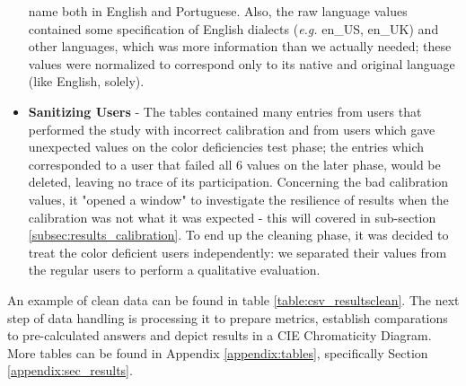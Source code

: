 \begin{itemize}
  name both in English and Portuguese. Also, the raw language values contained some specification of English dialects (\emph{e.g.} en\_US, en\_UK) and other languages,
  which was more information than we actually needed; these values were normalized to correspond only to its native and original language (like English, solely).
  \item \textbf{Sanitizing Users} - The tables contained many entries from users that performed the study with incorrect calibration and from users which
  gave unexpected values on the color deficiencies test phase; the entries which corresponded to a user that failed all 6 values on the later phase, would be
  deleted, leaving no trace of its participation. Concerning the bad calibration values, it "opened a window" to investigate the resilience of results when the
  calibration was not what it was expected - this will covered in sub-section \ref{subsec:results_calibration}. To end up the cleaning phase,
  it was decided to treat the color deficient users independently: we separated their values from the regular users to perform a qualitative evaluation.
\end{itemize} \par
%
An example of clean data can be found in table \ref{table:csv_resultsclean}. The next step of data handling is processing it to prepare metrics, establish comparations
to pre-calculated answers and depict results in a CIE Chromaticity Diagram. More tables can be found in Appendix \ref{appendix:tables}, specifically Section
\ref{appendix:sec_results}. \par
%
